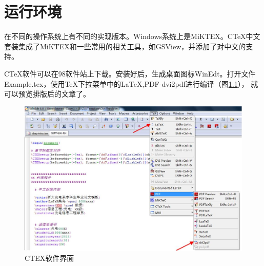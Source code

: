 \chapter{运行环境}
在不同的操作系统上有不同的实现版本。Windows系统上是MiKTEX。CTeX中文套装集成了MiKTEX和一些常用的相关工具，如GSView，并添加了对中文的支持。

CTeX软件可以在98软件站上下载。安装好后，生成桌面图标WinEdt。打开文件Example.tex，使用TeX下拉菜单中的LaTeX,PDF-dvi2pdf进行编译（图\ref{fig:CTEX}），
就可以预览排版后的文章了。

\begin{figure}[htbp]
\begin{center}
	\includegraphics[width=0.8\linewidth]{CTEX.jpg}
\end{center}
\caption{CTEX软件界面}
\label{fig:CTEX}
\end{figure}







